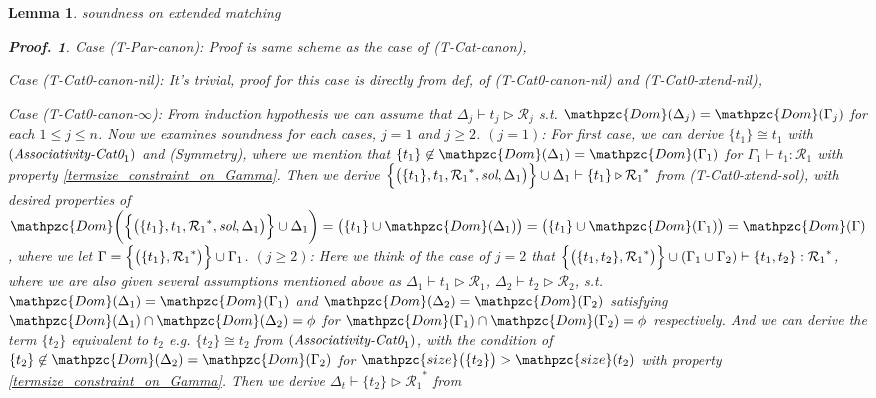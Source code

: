 \documentclass[12pt]{article}
\newtheorem{Lemma}{Lemma}[section]
\newtheorem{Proof}{Proof.}
\begin{document}
\begin{Lemma}{soundness on extended matching}
\begin{Proof}
    Case (T-Par-canon): Proof is same scheme as the case of
    (T-Cat-canon),
    
    Case (T-Cat0-canon-nil): It's trivial, proof for this case is directly
    from def, of (T-Cat0-canon-nil) and (T-Cat0-xtend-nil),
    
    Case (T-Cat0-canon-$\infty$): From induction hypothesis we can assume
    that $\Delta_j \vdash t_j \triangleright \mathcal{R}_j$ s.t.
    $\mathpzc{Dom}(\Delta_j) = \mathpzc{Dom}(\Gamma_j)$ for each
    $1 \le j \le n$. Now we examines soundness for each cases,
    $j = 1$ and $j \ge 2$.
    $(j = 1)$: For first case, we can derive $\{t_1\} \cong t_1$ with
    $(\text{\it Associativity-Cat0}_1)$ and (Symmetry), where we mention that
    $\{t_1\} \not\in \mathpzc{Dom}(\Delta_1) = \mathpzc{Dom}(\Gamma_1)$ for
    $\Gamma_1 \vdash t_1 : \mathcal{R}_1$ with
    property \ref{termsize_constraint_on_Gamma}. Then we derive    
    $\Bigl\{\bigl(\{t_1\}, t_1, {\mathcal{R}_1}^*, \text{\it sol}, \Delta_1
    \bigr) \Bigr\} \cup \Delta_1 \vdash \{t_1\}
    \triangleright {\mathcal{R}_1}^*$ from (T-Cat0-xtend-sol),
    with desired properties of
    $\mathpzc{Dom}\biggl(\Bigl\{\bigl(\{t_1\}, t_1, {\mathcal{R}_1}^*,
    \text{\it sol}, \Delta_1 \bigr) \Bigr\} \cup \Delta_1 \biggr) =
    \bigl(\{t_1\} \cup \mathpzc{Dom}(\Delta_1) \bigr) =
    \bigl(\{t_1\} \cup \mathpzc{Dom}(\Gamma_1) \bigr) =
    \mathpzc{Dom}(\Gamma)$, where we let
    $\Gamma = \Bigl\{\bigl(\{t_1\}, {\mathcal{R}_1}^* \bigr) \Bigr\} \cup
    \Gamma_1$.
    $(j \ge 2)$: Here we think of the case of $j = 2$ that
    $\Bigl\{\bigl(\{t_1, t_2\}, {\mathcal{R}_1}^*\bigr) \Bigr\} \cup
    (\Gamma_1 \cup \Gamma_2) \vdash \{t_1, t_2\} : {\mathcal{R}_1}^*$,
    where we are also given several assumptions mentioned above as
    $\Delta_1 \vdash t_1 \triangleright \mathcal{R}_1$,
    $\Delta_2 \vdash t_2 \triangleright \mathcal{R}_2$, s.t.
    $\mathpzc{Dom}(\Delta_1) = \mathpzc{Dom}(\Gamma_1)$ and
    $\mathpzc{Dom}(\Delta_2) = \mathpzc{Dom}(\Gamma_2)$ satisfying
    $\mathpzc{Dom}(\Delta_1) \cap \mathpzc{Dom}(\Delta_2) = \phi$ for
    $\mathpzc{Dom}(\Gamma_1) \cap \mathpzc{Dom}(\Gamma_2) = \phi$
    respectively.
    And we can derive the term $\{t_2\}$ equivalent to $t_2$ e.g.
    $\{t_2\} \cong t_2$ from $(\text{\it Associativity-Cat0}_1)$, with
    the condition of
    $\{t_2\} \not\in \mathpzc{Dom}(\Delta_2) = \mathpzc{Dom}(\Gamma_2)$
    for $\mathpzc{size}\bigl(\{t_2\} \bigr) > \mathpzc{size}(t_2)$ with
    property \ref{termsize_constraint_on_Gamma}. Then we derive
    $\Delta_t \vdash \{t_2\} \triangleright {\mathcal{R}_1}^*$ from

\end{Proof}
\end{Lemma}
\end{document}
